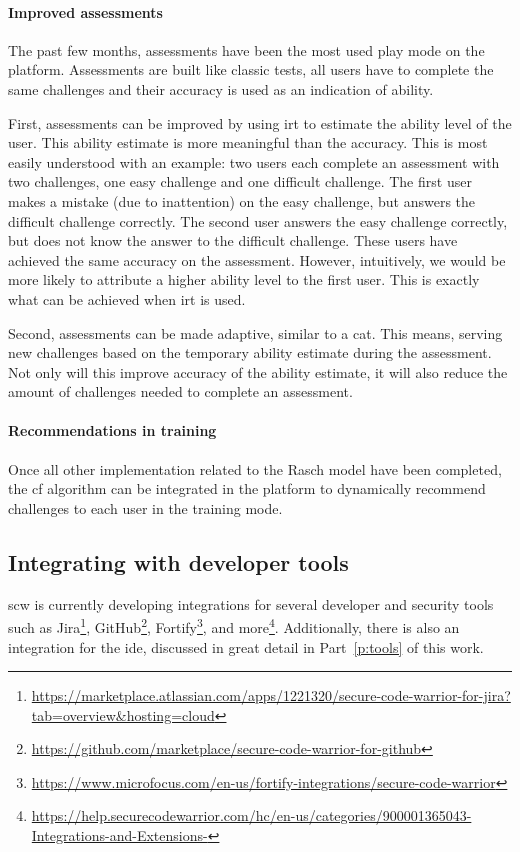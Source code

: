 \paragraph{Improved assessments}
The past few months, assessments have been the most used play mode on the platform.
Assessments are built like classic tests, all users have to complete the same challenges and their accuracy is used as an indication of ability.

First, assessments can be improved by using \gls{irt} to estimate the ability level of the user.
This ability estimate is more meaningful than the accuracy.
This is most easily understood with an example: two users each complete an assessment with two challenges, one easy challenge and one difficult challenge.
The first user makes a mistake (due to inattention) on the easy challenge, but answers the difficult challenge correctly.
The second user answers the easy challenge correctly, but does not know the answer to the difficult challenge.
These users have achieved the same accuracy on the assessment.
However, intuitively, we would be more likely to attribute a higher ability level to the first user.
This is exactly what can be achieved when \gls{irt} is used.

Second, assessments can be made adaptive, similar to a \gls{cat}.
This means, serving new challenges based on the temporary ability estimate during the assessment.
Not only will this improve accuracy of the ability estimate, it will also reduce the amount of challenges needed to complete an assessment.

\paragraph{Recommendations in training}
Once all other implementation related to the Rasch model have been completed, the \gls{cf} algorithm can be integrated in the platform to dynamically recommend challenges to each user in the training mode.

\subsection{Integrating with developer tools}
\label{sec:its-integration}
\Gls{scw} is currently developing integrations for several developer and security tools such as Jira\footnote{\url{https://marketplace.atlassian.com/apps/1221320/secure-code-warrior-for-jira?tab=overview&hosting=cloud}}, GitHub\footnote{\url{https://github.com/marketplace/secure-code-warrior-for-github}}, Fortify\footnote{\url{https://www.microfocus.com/en-us/fortify-integrations/secure-code-warrior}}, and more\footnote{\url{https://help.securecodewarrior.com/hc/en-us/categories/900001365043-Integrations-and-Extensions-}}.
Additionally, there is also an integration for the \gls{ide}, discussed in great detail in Part~\ref{p:tools} of this work.

